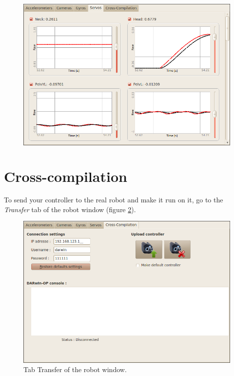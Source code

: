 \documentclass[a4paper, 12pt]{article}  		%
\begin{document}
\begin{figure}[H]
\begin{center}
\includegraphics[width=14cm]{window_servos.png}
\label{window_servos}
\end{center}
\end{figure}



\newpage
\section{Cross-compilation}

To send your controller to the real robot and make it run on it, go to the \textit{Transfer} tab of the robot window (figure \ref{window_cross}).

\begin{figure}[H]
\begin{center}
\includegraphics[width=13cm]{window_cross.png}
\caption{Tab Transfer of the robot window.}
\label{window_cross}
\end{center}
\end{figure}
\end{document}
